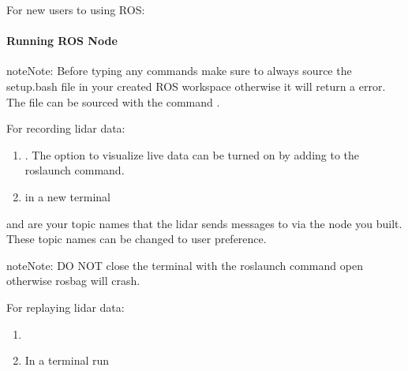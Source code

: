 \documentclass[letterpaper,10pt,english]{sphinxmanual}
\begin{document}
For new users to using ROS: 


\paragraph{Running ROS Node}
\label{\detokenize{Ouster lidar:running-ros-node}}
\begin{sphinxadmonition}{note}{Note:}
Before typing any commands make sure to always source the setup.bash file in your created ROS workspace otherwise it will return a error. The file can be sourced with the command .
\end{sphinxadmonition}

For recording lidar data:
\begin{enumerate}
\def\theenumi{\arabic{enumi}}
\def\labelenumi{\theenumi .}
\makeatletter\def\p@enumii{\p@enumi \theenumi .}\makeatother
\item {} 
. The option to visualize live data can be turned on by adding  to the roslaunch command.

\item {} 
 in a new terminal

\end{enumerate}

 and  are your topic names that the lidar sends messages to via the node you built. These topic names can be changed to user preference.

\begin{sphinxadmonition}{note}{Note:}
DO NOT close the terminal with the roslaunch command open otherwise rosbag will crash.
\end{sphinxadmonition}

For replaying lidar data:
\begin{enumerate}
\def\theenumi{\arabic{enumi}}
\def\labelenumi{\theenumi .}
\makeatletter\def\p@enumii{\p@enumi \theenumi .}\makeatother
\item {} 

\item {} 
In a  terminal run 

\end{enumerate}
\end{document}
